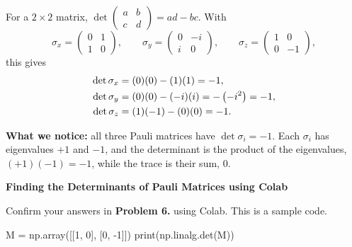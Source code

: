 \documentclass[a4paper, 10pt]{article}
\begin{document}
\begin{solution}
	\noindent For a \( 2 \times 2 \) matrix, \( \det \begin{pmatrix} a & b \\ c & d \end{pmatrix} = ad - bc \). With
	\[
		\sigma_x = \begin{pmatrix} 0 & 1 \\ 1 & 0 \end{pmatrix}, \qquad
		\sigma_y = \begin{pmatrix} 0 & -i \\ i & 0 \end{pmatrix}, \qquad
		\sigma_z = \begin{pmatrix} 1 & 0 \\ 0 & -1 \end{pmatrix},
	\]
	this gives
	\begin{align*}
		\det \sigma_x & = (0)(0) - (1)(1) = -1,                    \\
		\det \sigma_y & = (0)(0) - (-i)(i) = -\left(-i^{2}\right) = -1, \\
		\det \sigma_z & = (1)(-1) - (0)(0) = -1.
	\end{align*}

	\noindent \textbf{What we notice:} all three Pauli matrices have \( \det \sigma_i = -1 \).
	Each \( \sigma_i \) has eigenvalues \( +1 \) and \( -1 \), and the determinant is the product of the eigenvalues,
	\( (+1)(-1) = -1 \), while the trace is their sum, \( 0 \).
\end{solution}

\begin{problem}
\textbf{Finding the Determinants of Pauli Matrices using Colab}
\par Confirm your answers in \textbf{Problem 6.} using Colab.
This is a sample code.
\begin{codingbox}
M = np.array([[1, 0], [0, -1]])
print(np.linalg.det(M))
\end{codingbox}
\end{problem}
\end{document}

